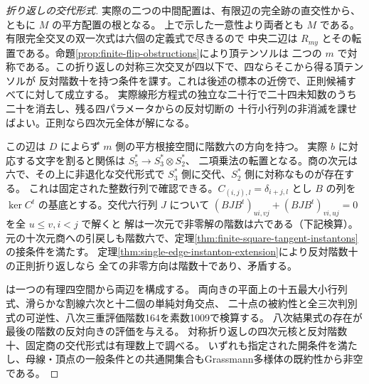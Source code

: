 \begin{proof}[折り返しの交代形式]
実際の二つの中間配置は、有限辺の完全跡の直交性から、ともに $M$ の平方配置の根となる。
上で示した一意性より両者とも $M$ である。有限完全交叉の双一次式は六個の定義式で尽きるので
中央二辺は $R_{my}$ とその転置である。命題\ref{prop:finite-flip-obstructions}により頂テンソルは
二つの $m$ で対称である。この折り返しの対称三次交叉が四以下で、四ならそこから得る頂テンソルが
反対階数十を持つ条件を課す。これは後述の標本の近傍で、正則候補すべてに対して成立する。
実際線形方程式の独立な二十行で二十四未知数のうち二十を消去し、残る四パラメータからの反対切断の
十行小行列の非消滅を課せばよい。正則なら四次元全体が解になる。

この辺は $D$ によらず $m$ 側の平方根接空間に階数六の方向を持つ。
実際 $b$ に対応する文字を割ると関係は $S_5^*\to S_3^*\otimes S_2^*$、
二項乗法の転置となる。商の次元は六で、その上に非退化な交代形式で
$S_3^*$ 側に交代、$S_2^*$ 側に対称なものが存在する。
これは固定された整数行列で確認できる。$C_{(i,j),l}=\delta_{i+j,l}$ とし
$B$ の列を $\ker C^t$ の基底とする。交代六行列 $J$ について
$(BJB^t)_{ui,vj}+(BJB^t)_{vi,uj}=0$ を全 $u\le v,i<j$ で解くと
解は一次元で非零解の階数は六である（下記検算）。
元の十次元商への引戻しも階数六で、定理\ref{thm:finite-square-tangent-instantons}の接条件を満たす。
定理\ref{thm:single-edge-instanton-extension}により反対階数十の正則折り返しなら
全ての非零方向は階数十であり、矛盾する。

 は一つの有理四空間から両辺を構成する。
両向きの平面上の十五最大小行列式、滑らかな割線六次と十二個の単純対角交点、
二十点の被約性と全三次判別式の可逆性、八次三重評価階数164を素数1009で検算する。
八次結果式の存在が最後の階数の反対向きの評価を与える。
対称折り返しの四次元核と反対階数十、固定商の交代形式は有理数上で調べる。
いずれも指定された開条件を満たし、母線・頂点の一般条件との共通開集合もGrassmann多様体の既約性から非空である。
\end{proof}
